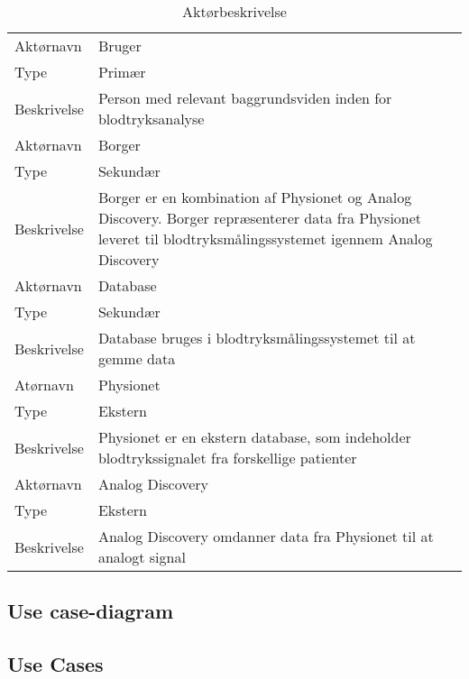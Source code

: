 \begin{table}[H]
\begin{tabularx}{\textwidth}{l X}
     Aktørnavn & Bruger \\
     Type & Primær \\
     Beskrivelse  & Person med relevant baggrundsviden inden for blodtryksanalyse \\ 
     \midrule
     Aktørnavn & Borger  \\
     Type & Sekundær \\
     Beskrivelse  & Borger er en kombination af Physionet og Analog Discovery. Borger repræsenterer data fra Physionet leveret til blodtryksmålingssystemet igennem Analog Discovery \\
     \midrule
     Aktørnavn & Database \\
     Type & Sekundær \\
     Beskrivelse  & Database bruges i blodtryksmålingssystemet til at gemme data \\ 
     \midrule
     Atørnavn & Physionet \\
     Type & Ekstern  \\
     Beskrivelse  & Physionet er en ekstern database, som indeholder blodtrykssignalet fra forskellige patienter \\
     \midrule
     Aktørnavn & Analog Discovery  \\
     Type & Ekstern \\
     Beskrivelse  & Analog Discovery omdanner data fra Physionet til at analogt signal \\                                                                                                                                                                          
     \bottomrule                                                                                                                   
    \end{tabularx}
    \caption {Aktørbeskrivelse}
    \label{tab:aktoerbeskrivelse}
	
\end{table}

\subsection{Use case-diagram}


\subsection{Use Cases}

